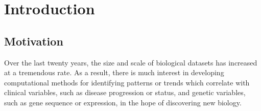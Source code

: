 %

\chapter[Introduction]{ \label{chapter:intro} Introduction}

\section{Motivation}

Over the last twenty years, the size and scale of biological datasets has increased at a tremendous rate.
As a result, there is much interest in developing computational methods for identifying patterns or trends 
which correlate with clinical variables, such as disease progression or status,
and genetic variables, such as gene sequence or expression, in the hope of discovering new biology.


